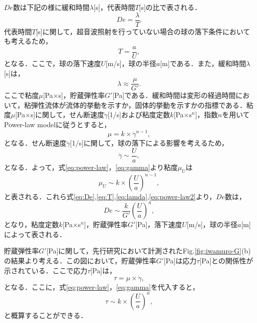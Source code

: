 $De$数は下記の様に緩和時間$\lambda$[s]，代表時間$T$[s]の比で表される．
\begin{equation}
    De = \frac{\lambda}{T} .
    \label{eq:De}
\end{equation}
代表時間$T$[s]に関して，超音波照射を行っていない場合の球の落下条件においても考えるため，
\begin{equation}
    T = \frac{a}{U} ,
    \label{eq:T}
\end{equation}
となる．ここで，球の落下速度$U$[m/s]，球の半径$a$[m]である．また，緩和時間$\lambda$[s]は，
\begin{equation}
    \lambda \approx \frac{\mu}{G'} .
    \label{eq:lamda}
\end{equation}
ここで粘度$\mu$[Pa$\times$s]，貯蔵弾性率$G'$[Pa]である．緩和時間は変形の経過時間において，粘弾性流体が流体的挙動を示すか，固体的挙動を示すかの指標である\cite{ref:sakanishi}．粘度$\mu$[Pa$\times$s]に関して，せん断速度$\dot{\gamma}$[1/s]および粘度定数$k$[Pa$\times$s${}^n$]，指数$n$を用いてPower-law modelに従うとすると，
\begin{equation}
    \mu = k \times \dot{\gamma}^{n-1} ,
    \label{eq:power-law}
\end{equation}
となる．せん断速度$\dot{\gamma}$[1/s]に関して，球の落下による影響を考えるため，
\begin{equation}
    \dot{\gamma} \sim \frac{U}{a} ,
    \label{eq:gamma}
\end{equation}
となる．よって，式\ref{eq:power-law}，\ref{eq:gamma}より粘度$\mu_U$は
\begin{equation}
    \mu_U \sim k \times \left(\frac{U}{a}\right)^{n-1} ,
    \label{eq:power-law2}
\end{equation}
と表される．これら式\ref{eq:De},\ref{eq:T},\ref{eq:lamda},\ref{eq:power-law2}より，$De$数は，
\begin{equation}
    De \sim \frac{k}{G'} {\left(\frac{U}{a}\right)}^n ,
    \label{eq:De2}
\end{equation}
となり，粘度定数$k$[Pa$\times$s${}^n$]，貯蔵弾性率$G'$[Pa]，落下速度$U$[m/s]，球の半径$a$[m]によって表される．

貯蔵弾性率$G'$[Pa]に関して，先行研究において計測されたFig.\ref{fig:iwamuro-G}(b)の結果より考える．この図において，貯蔵弾性率$G'$[Pa]は応力$\tau$[Pa]との関係性が示されている．ここで応力$\tau$[Pa]は，
\begin{equation}
    \tau = \mu \times \dot{\gamma} ,
    \label{eq:tau}
\end{equation}
となる．ここに，式\ref{eq:power-law}，\ref{eq:gamma}を代入すると，
\begin{equation}
    \tau \sim k \times \left(\frac{U}{a}\right)^n , 
    \label{eq:tau-cal}
\end{equation}
と概算することができる．

